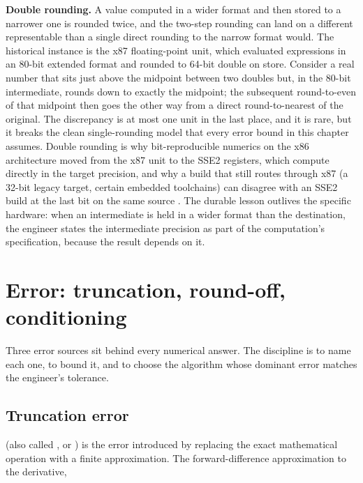 \begin{mastery}
\textbf{Double rounding.} A value computed in a wider format and then
stored to a narrower one is rounded twice, and the two-step rounding can
land on a different representable than a single direct rounding to the
narrow format would. The historical instance is the x87 floating-point
unit, which evaluated expressions in an 80-bit extended format and rounded
to 64-bit double on store. Consider a real number that sits just above the
midpoint between two doubles but, in the 80-bit intermediate, rounds
down to exactly the midpoint; the subsequent round-to-even of that
midpoint then goes the other way from a direct round-to-nearest of the
original. The discrepancy is at most one unit in the last place, and it
is rare, but it breaks the clean single-rounding model that every error
bound in this chapter assumes. Double rounding is why bit-reproducible
numerics on the x86 architecture moved from the x87 unit to the SSE2
registers, which compute directly in the target precision, and why a
build that still routes through x87 (a 32-bit legacy target, certain
embedded toolchains) can disagree with an SSE2 build at the last bit on
the same source \cite[ch.~3]{text:overton-ieee754}. The durable lesson
outlives the specific hardware: when an intermediate is held in a wider
format than the destination, the engineer states the intermediate
precision as part of the computation's specification, because the result
depends on it.
\end{mastery}

\section{Error: truncation, round-off, conditioning}

Three error sources sit behind every numerical answer. The
discipline is to name each one, to bound it, and to choose the
algorithm whose dominant error matches the engineer's tolerance.

\subsection{Truncation error}

 (also called , or ) is the error introduced by
replacing the exact mathematical operation with a finite
approximation. The forward-difference approximation to the
derivative,

